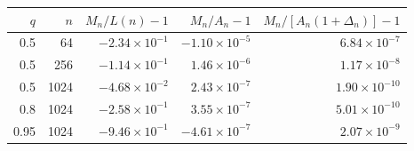 \begin{tabular}{rr rrr}
\toprule
$q$ & $n$ & $M_n/L(n)-1$ & $M_n/A_n-1$ & $M_n/[A_n(1+\Delta_n)]-1$\\
\midrule
0.5 & 64 & $-2.34\times10^{-1}$ & $-1.10\times10^{-5}$ & $6.84\times10^{-7}$\\
0.5 & 256 & $-1.14\times10^{-1}$ & $1.46\times10^{-6}$ & $1.17\times10^{-8}$\\
0.5 & 1024 & $-4.68\times10^{-2}$ & $2.43\times10^{-7}$ & $1.90\times10^{-10}$\\
0.8 & 1024 & $-2.58\times10^{-1}$ & $3.55\times10^{-7}$ & $5.01\times10^{-10}$\\
0.95 & 1024 & $-9.46\times10^{-1}$ & $-4.61\times10^{-7}$ & $2.07\times10^{-9}$\\
\bottomrule
\end{tabular}
